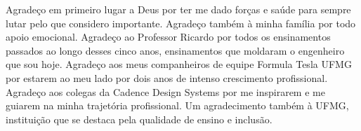 \begin{agradecimentos}
    Agradeço em primeiro lugar a Deus por ter me dado forças e saúde para sempre lutar pelo que considero importante. Agradeço também à minha família por todo apoio emocional. Agradeço ao Professor Ricardo por todos os ensinamentos passados ao longo desses cinco anos, ensinamentos que moldaram o engenheiro que sou hoje. Agradeço aos meus companheiros de equipe Formula Tesla UFMG por estarem ao meu lado por dois anos de intenso crescimento profissional. Agradeço aos colegas da Cadence Design Systems por me inspirarem e me guiarem na minha trajetória profissional. Um agradecimento também à UFMG, instituição que se destaca pela qualidade de ensino e inclusão.
\end{agradecimentos}
